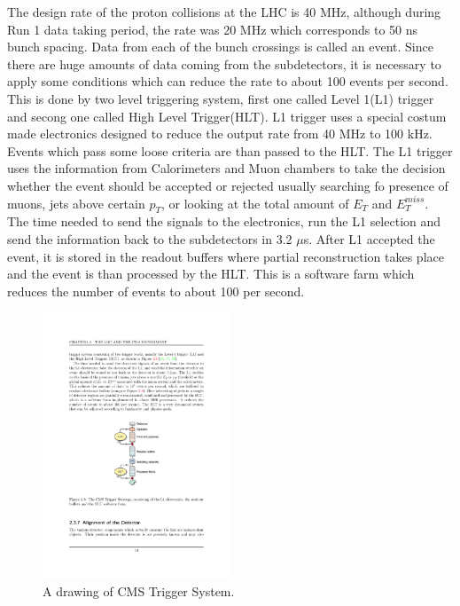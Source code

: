 The design rate of the proton collisions at the LHC is 40 MHz, although during Run 1 data taking period, the rate was 20 MHz which corresponds to 50 ns bunch spacing. Data from each of the bunch crossings is called an event. Since there are huge amounts of data coming from the subdetectors, it is necessary to apply some conditions which can reduce the rate to about 100 events per second. This is done by two level triggering system, first one called Level 1(L1) trigger and secong one called High Level Trigger(HLT). L1 trigger uses a special costum made electronics designed to reduce the output rate from 40 MHz to 100 kHz. Events which pass some loose criteria are than passed to the HLT. The L1 trigger uses the information from Calorimeters and Muon chambers to take the decision whether the event should be accepted or rejected usually searching fo presence of muons, jets above certain $p_T$, or looking at the total amount of $E_T$ and $E_T^{miss}$. The time needed to send the signals to the electronics, run the L1 selection and send the information back to the subdetectors in 3.2 $\mu$s. After L1 accepted the event, it is stored in the readout buffers where partial reconstruction takes place and the event is than processed by the HLT. This is a software farm which reduces the number of events to about 100 per second. 
\begin{figure}[htbp]
	\centering
		\includegraphics[width=0.5\textwidth]{Figures/trigger.pdf}
	\caption[A drawing of CMS Trigger System.]{A drawing of CMS Trigger System. \cite{Chatrchyan:2008aa}}
	\label{fig:trig}
\end{figure}
